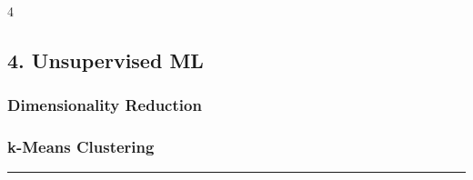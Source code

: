 \documentclass[8pt,a4paper,landscape]{extarticle}
\begin{document}
\begin{multicols*}{4}
\subsection{4. Unsupervised ML}
\subsubsection{Dimensionality Reduction}
\subsubsection{k-Means Clustering}

\vspace{4pt}
\hrule
\vspace{4pt}
\fi

\end{multicols*}
\end{document}
